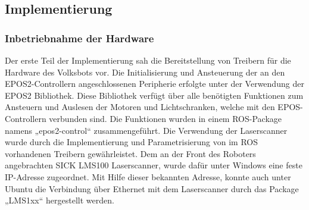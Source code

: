 \subsection{Implementierung}

\subsubsection{Inbetriebnahme der Hardware}
Der erste Teil der Implementierung sah die Bereitstellung von Treibern für die Hardware des Volksbots vor. Die Initialisierung und Ansteuerung der an den EPOS2-Controllern angeschlossenen Peripherie erfolgte unter der Verwendung der EPOS2 Bibliothek. Diese Bibliothek verfügt über alle benötigten Funktionen zum Ansteuern und Auslesen der Motoren und Lichtschranken, welche mit den EPOS-Controllern verbunden sind. Die Funktionen wurden in einem ROS-Package namens „epos2-control“ zusammengeführt.
Die Verwendung der Laserscanner wurde durch die Implementierung und Parametrisierung von im ROS vorhandenen Treibern gewährleistet. Dem an der Front des Roboters angebrachten SICK LMS100 Laserscanner, wurde dafür unter Windows eine feste IP-Adresse zugeordnet. Mit Hilfe dieser bekannten Adresse, konnte auch unter Ubuntu die Verbindung über Ethernet mit dem Laserscanner durch das Package „LMS1xx“  hergestellt werden.

